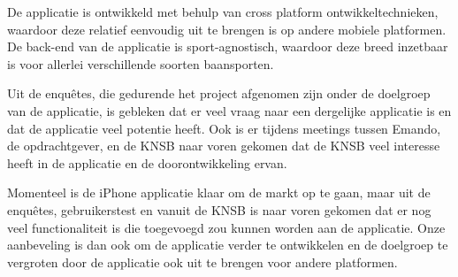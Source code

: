 \medskip

\noindent
De applicatie is ontwikkeld met behulp van cross platform ontwikkeltechnieken, waardoor deze relatief eenvoudig uit te brengen is op andere mobiele platformen. De back-end van de applicatie is sport-agnostisch, waardoor deze breed inzetbaar is voor allerlei verschillende soorten baansporten.

\medskip

\noindent 
Uit de enquêtes, die gedurende het project afgenomen zijn onder de doelgroep van de applicatie, is gebleken dat er veel vraag naar een dergelijke applicatie is en dat de applicatie veel potentie heeft. Ook is er tijdens meetings tussen Emando, de opdrachtgever, en de \ac{KNSB} naar voren gekomen dat de \ac{KNSB} veel interesse heeft in de applicatie en de doorontwikkeling ervan.

\medskip

\noindent
Momenteel is de iPhone applicatie klaar om de markt op te gaan, maar uit de enquêtes, gebruikerstest en vanuit de \ac{KNSB} is naar voren gekomen dat er nog veel functionaliteit is die toegevoegd zou kunnen worden aan de applicatie. Onze aanbeveling is dan ook om de applicatie verder te ontwikkelen en de doelgroep te vergroten door de applicatie ook uit te brengen voor andere platformen.